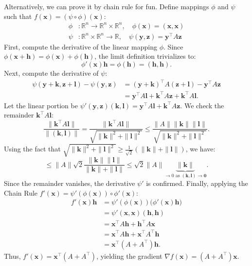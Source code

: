 \documentclass[12pt]{article}
\begin{document}
\begin{pfbox}
Alternatively, we can prove it by chain rule for fun. 
Define mappings $\phi$ and $\psi$ such that $f(\mathbf{x}) = (\psi \circ \phi)(\mathbf{x})$:
\begin{align*}
    \phi &: \mathbb{R}^n \to \mathbb{R}^n \times \mathbb{R}^n, \quad \phi(\mathbf{x}) = (\mathbf{x}, \mathbf{x}) \\
    \psi &: \mathbb{R}^n \times \mathbb{R}^n \to \mathbb{R}, \quad \psi(\mathbf{y}, \mathbf{z}) = \mathbf{y}^\top A \mathbf{z}
\end{align*}
First, compute the derivative of the linear mapping $\phi$. Since $\phi(\mathbf{x} + \mathbf{h}) = \phi(\mathbf{x}) + \phi(\mathbf{h})$, the limit definition trivializes to:
$$ \phi'(\mathbf{x})\mathbf{h} = \phi(\mathbf{h}) = (\mathbf{h}, \mathbf{h}). $$
Next, compute the derivative of $\psi$:
\begin{align*}
    \psi(\mathbf{y} + \mathbf{k}, \mathbf{z} + \mathbf{l}) - \psi(\mathbf{y}, \mathbf{z}) &= (\mathbf{y} + \mathbf{k})^\top A (\mathbf{z} + \mathbf{l}) - \mathbf{y}^\top A \mathbf{z} \\
    &= \mathbf{y}^\top A \mathbf{l} + \mathbf{k}^\top A \mathbf{z} + \mathbf{k}^\top A \mathbf{l}.
\end{align*}
Let the linear portion be $\psi'(\mathbf{y}, \mathbf{z})(\mathbf{k}, \mathbf{l}) = \mathbf{y}^\top A \mathbf{l} + \mathbf{k}^\top A \mathbf{z}$. We check the remainder $\mathbf{k}^\top A \mathbf{l}$:
$$ \frac{\|\mathbf{k}^\top A \mathbf{l}\|}{\|(\mathbf{k}, \mathbf{l})\|} = \frac{\|\mathbf{k}^\top A \mathbf{l}\|}{\sqrt{\|\mathbf{k}\|^2 + \|\mathbf{l}\|^2}} \le \frac{\|A\| \|\mathbf{k}\| \|\mathbf{l}\|}{\sqrt{\|\mathbf{k}\|^2 + \|\mathbf{l}\|^2}}. $$
Using the fact that $\sqrt{\|\mathbf{k}\|^2 + \|\mathbf{l}\|^2} \ge \frac{1}{\sqrt{2}}(\|\mathbf{k}\| + \|\mathbf{l}\|)$, we have:
$$ \le \|A\|\sqrt{2} \frac{\|\mathbf{k}\| \|\mathbf{l}\|}{\|\mathbf{k}\| + \|\mathbf{l}\|} \le \sqrt{2}\|A\| \underbrace{\|\mathbf{k}\|}_{\to 0 \text{ as } (\mathbf{k},\mathbf{l}) \to \mathbf{0}}. $$
Since the remainder vanishes, the derivative $\psi'$ is confirmed.
Finally, applying the Chain Rule $f'(\mathbf{x}) = \psi'(\phi(\mathbf{x})) \circ \phi'(\mathbf{x})$:
\begin{align*}
    f'(\mathbf{x})\mathbf{h} &= \psi'(\phi(\mathbf{x}))\big(\phi'(\mathbf{x})\mathbf{h}\big) \\
    &= \psi'(\mathbf{x}, \mathbf{x})(\mathbf{h}, \mathbf{h}) \\
    &= \mathbf{x}^\top A \mathbf{h} + \mathbf{h}^\top A \mathbf{x} \\
    &= \mathbf{x}^\top A \mathbf{h} + \mathbf{x}^\top A^\top \mathbf{h} \\
    &= \mathbf{x}^\top(A + A^\top)\mathbf{h}.
\end{align*}
Thus, $f'(\mathbf{x}) = \mathbf{x}^\top(A + A^\top)$, yielding the gradient $\nabla f(\mathbf{x}) = (A + A^\top)\mathbf{x}$.\\


\end{pfbox}
\end{document}
